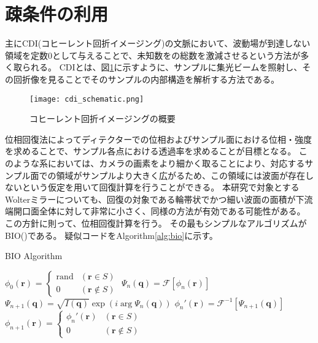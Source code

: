 \clearpage
\newpage

\section{疎条件の利用}
主にCDI(コヒーレント回折イメージング)の文脈において、波動場が到達しない領域を定数0として与えることで、未知数をの総数を激減させるという方法が多く取られる。
CDIとは、図\ref{fig:cdi_schematic}に示すように、サンプルに集光ビームを照射し、その回折像を見ることでそのサンプルの内部構造を解析する方法である。

\begin{figure}[!ht]
\centering
\texttt{[image: cdi\_schematic.png]}
\caption{コヒーレント回折イメージングの概要}
\label{fig:cdi_schematic}
\end{figure}

位相回復法によってディテクターでの位相およびサンプル面における位相・強度を求めることで、サンプル各点における透過率を求めることが目標となる。
このような系においては、カメラの画素をより細かく取ることにより、対応するサンプル面での領域がサンプルより大きく広がるため、この領域には波面が存在しないという仮定を用いて回復計算を行うことができる。
本研究で対象とするWolterミラーについても、回復の対象である輪帯状でかつ細い波面の面積が下流端開口面全体に対して非常に小さく、同様の方法が有効である可能性がある。
この方針に則って、位相回復計算を行う。
その最もシンプルなアルゴリズムがBIO()である。
疑似コードをAlgorithm\ref{alg:bio}に示す。

\newcommand{\pos} {
    \mathbf{r}
}
\newcommand{\rpos} {
    \mathbf{q}
}

\begin{algorithm}                      
\caption{BIO Algorithm}         
\label{alg:bio}                          
\begin{algorithmic}
    \STATE $\phi_0(\pos)$
      = $\begin{cases}
        \mathrm{rand} & (\pos \in S) \\
        0 & (\pos \notin S)
      \end{cases}$
    \STATE $\Psi_n(\rpos) = \mathcal F [\phi_n(\pos)]$
    \STATE $\Psi_{n+1}(\rpos) = \sqrt{I(\rpos)} \exp \left( i \arg \Psi_n(\rpos) \right)$ 
    \STATE $\phi_n'(\pos) = \mathcal F^{-1} [\Psi_{n+1}(\rpos)]$
    \STATE $\phi_{n+1}(\pos)
      = \begin{cases}
          \phi_n'(\pos) & (\pos \in S) \\
          0 & (\pos \notin S)
      \end{cases}$
    \ENDFOR
\end{algorithmic}
\end{algorithm}

